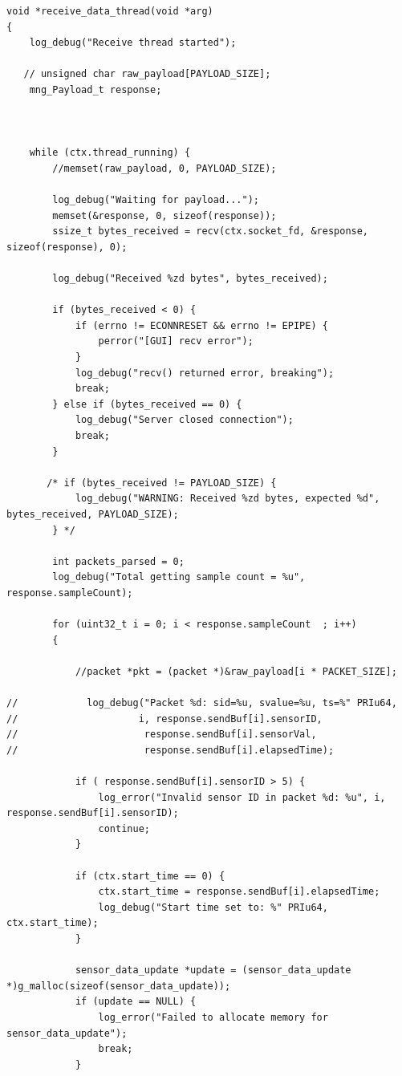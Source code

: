 \begin{verbatim}
void *receive_data_thread(void *arg)
{
    log_debug("Receive thread started");

   // unsigned char raw_payload[PAYLOAD_SIZE];
    mng_Payload_t response;



    while (ctx.thread_running) {
        //memset(raw_payload, 0, PAYLOAD_SIZE);

        log_debug("Waiting for payload...");
        memset(&response, 0, sizeof(response));
        ssize_t bytes_received = recv(ctx.socket_fd, &response, sizeof(response), 0);

        log_debug("Received %zd bytes", bytes_received);

        if (bytes_received < 0) {
            if (errno != ECONNRESET && errno != EPIPE) {
                perror("[GUI] recv error");
            }
            log_debug("recv() returned error, breaking");
            break;
        } else if (bytes_received == 0) {
            log_debug("Server closed connection");
            break;
        }

       /* if (bytes_received != PAYLOAD_SIZE) {
            log_debug("WARNING: Received %zd bytes, expected %d", bytes_received, PAYLOAD_SIZE);
        } */

        int packets_parsed = 0;
        log_debug("Total getting sample count = %u",  response.sampleCount);

        for (uint32_t i = 0; i < response.sampleCount  ; i++)
        {

            //packet *pkt = (packet *)&raw_payload[i * PACKET_SIZE];

//            log_debug("Packet %d: sid=%u, svalue=%u, ts=%" PRIu64,
//                     i, response.sendBuf[i].sensorID,
//					 	response.sendBuf[i].sensorVal,
//						response.sendBuf[i].elapsedTime);

            if ( response.sendBuf[i].sensorID > 5) {
                log_error("Invalid sensor ID in packet %d: %u", i, response.sendBuf[i].sensorID);
                continue;
            }

            if (ctx.start_time == 0) {
                ctx.start_time = response.sendBuf[i].elapsedTime;
                log_debug("Start time set to: %" PRIu64, ctx.start_time);
            }

            sensor_data_update *update = (sensor_data_update *)g_malloc(sizeof(sensor_data_update));
            if (update == NULL) {
                log_error("Failed to allocate memory for sensor_data_update");
                break;
            }


\end{verbatim}
